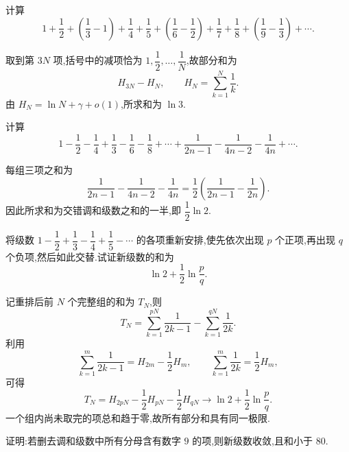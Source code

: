 \begin{example}
    计算
    \[
        1+\dfrac{1}{2}+\left(\dfrac{1}{3}-1\right)+\dfrac{1}{4}+\dfrac{1}{5}
        +\left(\dfrac{1}{6}-\dfrac{1}{2}\right)+\dfrac{1}{7}+\dfrac{1}{8}
        +\left(\dfrac{1}{9}-\dfrac{1}{3}\right)+\cdots.
    \]
\end{example}
\exampleblank

\begin{solution}
    取到第 $3N$ 项,括号中的减项恰为 $1,\dfrac{1}{2},\ldots,\dfrac{1}{N}$,故部分和为
    \[
        H_{3N}-H_N,
        \qquad H_N=\sum\limits_{k=1}^{N}\dfrac{1}{k}.
    \]
    由 $H_N=\ln N+\gamma+o(1)$,所求和为 $\boxed{\ln3}$.
\end{solution}

\begin{example}
    计算
    \[
        1-\dfrac{1}{2}-\dfrac{1}{4}+\dfrac{1}{3}-\dfrac{1}{6}-\dfrac{1}{8}
        +\cdots+\dfrac{1}{2n-1}-\dfrac{1}{4n-2}-\dfrac{1}{4n}+\cdots.
    \]
\end{example}
\exampleblank

\begin{solution}
    每组三项之和为
    \[
        \dfrac{1}{2n-1}-\dfrac{1}{4n-2}-\dfrac{1}{4n}
        =\dfrac{1}{2}\left(\dfrac{1}{2n-1}-\dfrac{1}{2n}\right).
    \]
    因此所求和为交错调和级数之和的一半,即 $\boxed{\dfrac{1}{2}\ln2}$.
\end{solution}

\begin{example}
    将级数 $\displaystyle1-\dfrac{1}{2}+\dfrac{1}{3}-\dfrac{1}{4}+\dfrac{1}{5}-\cdots$ 的各项重新安排,使先依次出现 $p$ 个正项,再出现 $q$ 个负项,然后如此交替.试证新级数的和为
    \[
        \ln2+\dfrac{1}{2}\ln\dfrac{p}{q}.
    \]
\end{example}
\exampleblank

\begin{solution}
    记重排后前 $N$ 个完整组的和为 $T_N$,则
    \[
        T_N=\sum\limits_{k=1}^{pN}\dfrac{1}{2k-1}
        -\sum\limits_{k=1}^{qN}\dfrac{1}{2k}.
    \]
    利用
    \[
        \displaystyle\sum\limits_{k=1}^{m}\dfrac{1}{2k-1}=H_{2m}-\dfrac{1}{2}H_m,
        \qquad
        \sum\limits_{k=1}^{m}\dfrac{1}{2k}=\dfrac{1}{2}H_m,
    \]
    可得
    \[
        T_N=H_{2pN}-\dfrac{1}{2}H_{pN}-\dfrac{1}{2}H_{qN}
        \longrightarrow\ln2+\dfrac{1}{2}\ln\dfrac{p}{q}.
    \]
    一个组内尚未取完的项总和趋于零,故所有部分和具有同一极限.
\end{solution}

\begin{example}
    证明:若删去调和级数中所有分母含有数字 $9$ 的项,则新级数收敛,且和小于 $80$.
\end{example}
\exampleblank

